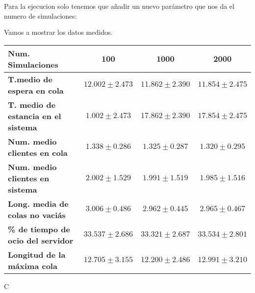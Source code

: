\documentclass[]{article}
\begin{document}
Para la ejecucion solo tenemos que añadir un nuevo parámetro que nos da el numero de simulaciones:

\scalebox{0.8}{%
$./colammk <numeroServidores> <tiempoParada> <tlleg> <tserv> <numRepeticiones>$}

Vamos a mostrar los datos medidos.
\begin{table}[H]
	\begin{center}
		\begin{tabularx}{1\textwidth}{|X|c|c|c|}
			\hline
			\textbf{Num. Simulaciones} &  100 & 1000 & 2000\\
			\hline \hline
			\textbf{T.medio de espera en cola}& $12.002\pm2.473$ & $11.862\pm2.390$ & $11.854\pm2.475$ \\ \hline
			\textbf{T. medio de estancia en el sistema}& $1.002\pm2.473$ & $17.862\pm2.390$ & $17.854\pm2.475$ \\ \hline
			\textbf{Num. medio clientes en cola}& $1.338\pm0.286$ & $1.325\pm0.287$& $1.320\pm0.295$ \\  \hline
			\textbf{Num. medio clientes en sistema}& $2.002\pm1.529$ & $1.991\pm1.519$& $1.985\pm1.516$ \\ \hline
			\textbf{Long. media de colas no vaciás}& $3.006\pm0.486$ & $2.962\pm0.445$& $2.965\pm0.467$ \\ \hline
			\textbf{\% de tiempo de ocio del servidor}& $33.537\pm2.686$ & $33.321\pm2.687$& $33.534\pm2.801$ \\ \hline
			\textbf{Longitud de la máxima cola}& $12.705\pm3.155$  &$12.200\pm2.486$& $12.991\pm3.210$ \\ \hline
		\end{tabularx}
		
	\end{center}
\end{table}
C
\end{document}

